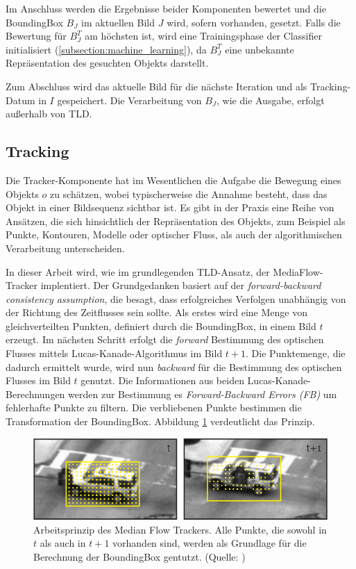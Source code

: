 	Im Anschluss werden die Ergebnisse beider Komponenten bewertet und die BoundingBox $B_J$ im aktuellen Bild $J$ wird, sofern vorhanden, gesetzt. Falls die Bewertung für $B_J^T$ am höchsten ist, wird eine Trainingsphase der Classifier initialisiert (\ref{subsection:machine_learning}), da $B_J^T$ eine unbekannte Repräsentation des gesuchten Objekts darstellt.

	Zum Abschluss wird das aktuelle Bild für die nächste Iteration und als Tracking-Datum in $I$ gespeichert. Die Verarbeitung von $B_J$, wie die Ausgabe, erfolgt außerhalb von TLD.  

	\subsection{Tracking}
	\label{subsection:tracking}
	Die Tracker-Komponente hat im Wesentlichen die Aufgabe die Bewegung eines Objekts $o$ zu schätzen, wobei typischerweise die Annahme besteht, dass das Objekt in einer Bildsequenz sichtbar ist. Es gibt in der Praxis eine Reihe von Ansätzen, die sich hinsichtlich der Repräsentation des Objekts, zum Beispiel als Punkte, Kontouren, Modelle oder optischer Fluss, als auch der algorithmischen Verarbeitung unterscheiden.

	In dieser Arbeit wird, wie im grundlegenden TLD-Ansatz, der MediaFlow- Tracker \cite{MFT} implentiert. Der Grundgedanken basiert auf der\textit{ forward-backward consistency assumption}, die besagt, dass erfolgreiches Verfolgen unabhängig von der Richtung des Zeitflusses sein sollte. Als erstes wird eine Menge von gleichverteilten Punkten, definiert durch die BoundingBox, in einem Bild $t$ erzeugt. Im nächsten Schritt erfolgt die \textit{forward} Bestimmung des optischen Flusses mittels Lucas-Kanade-Algorithmus \cite{OPT} im Bild $t+1$. Die Punktemenge, die dadurch ermittelt wurde, wird nun \textit{backward} für die Bestimmung des optischen Flusses im Bild $t$ genutzt. Die Informationen aus beiden Lucas-Kanade-Berechnungen werden zur Bestimmung es \textit{Forward-Backward Errors (FB)} um fehlerhafte Punkte zu filtern. Die verbliebenen Punkte bestimmen die Transformation der BoundingBox. Abbildung \ref{fig:MFT} verdeutlicht das Prinzip.

	\begin{figure}
	\centering{}\includegraphics[scale=0.7]{../pictures/MediaFlow_0.png}\caption[Arbeitsweise des Median Flow Trackers]{Arbeitsprinzip des Median Flow Trackers. Alle Punkte, die sowohl in $t$ als auch in $t+1$ vorhanden sind, werden als Grundlage für die Berechnung der BoundingBox gentutzt. (Quelle: \cite{MFT})\label{fig:MFT} }
	\end{figure}

